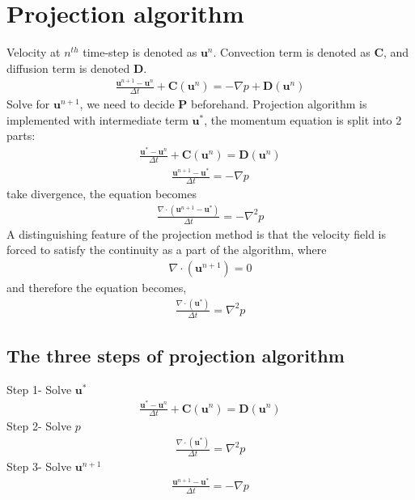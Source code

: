 \documentclass[11pt,dvips]{article}
\numberwithin{equation}{section}
\begin{document}
\section{Projection algorithm}
Velocity at $n^{th}$ time-step is denoted as $\mathbf{u}^n$. Convection term is denoted as $\mathbf{C}$, and diffusion term is denoted $\mathbf{D}$.
\begin{align*}
\frac{\mathbf{u}^{n+1}-\mathbf{u}^{n}}{\Delta t}+\mathbf{C}(\mathbf{u}^{n})=-\nabla p+\mathbf{D}(\mathbf{u}^{{n}}) 
\tag{6}
\end{align*}
Solve for $\mathbf{u}^{n+1}$, we need to decide $\mathbf{P}$ beforehand. Projection algorithm is implemented with intermediate term $\mathbf{u}^{*}$, the momentum equation is split into 2 parts: 
\begin{align*}
\frac{\mathbf{u}^{*}-\mathbf{u}^{n}}{\Delta t}+\mathbf{C}(\mathbf{u}^{n})=\mathbf{D}(\mathbf{u}^{{n}}) 
\tag{6a} 
\end{align*}
\begin{align*}
\frac{\mathbf{u}^{n+1}-\mathbf{u}^{*}}{\Delta t}=-\nabla p
\tag{6b}
\end{align*}
take divergence, the equation becomes
\begin{align*}
\frac{\nabla \cdot(\mathbf{u}^{n+1}-\mathbf{u}^{*})}{\Delta t}=-\nabla ^2 p
\tag{7}
\end{align*}
A distinguishing feature of the projection method is that the velocity field is forced to satisfy the continuity as a part of the algorithm, where
\begin{align*}
\nabla \cdot(\mathbf{u}^{n+1})=0
\tag{8}
\end{align*}
and therefore  the equation becomes, 
\begin{align*}
\frac{\nabla \cdot(\mathbf{u}^{*})}{\Delta t}=\nabla ^2 p
\tag{9}
\end{align*}

\subsection{The three steps of projection algorithm}
Step 1- Solve $\mathbf{u}^{*}$
\begin{align*}
\frac{\mathbf{u}^{*}-\mathbf{u}^{n}}{\Delta t}+\mathbf{C}(\mathbf{u}^{n})=\mathbf{D}(\mathbf{u}^{{n}}) 
\tag{6a}
\end{align*}
Step 2- Solve $p$
\begin{align*}
\frac{\nabla \cdot(\mathbf{u}^{*})}{\Delta t}=\nabla ^2 p
\tag{9}
\end{align*}
Step 3- Solve $\mathbf{u}^{n+1}$
\begin{align*}
\frac{\mathbf{u}^{n+1}-\mathbf{u}^{*}}{\Delta t}=-\nabla p
\tag{6b}
\end{align*}
\end{document}
